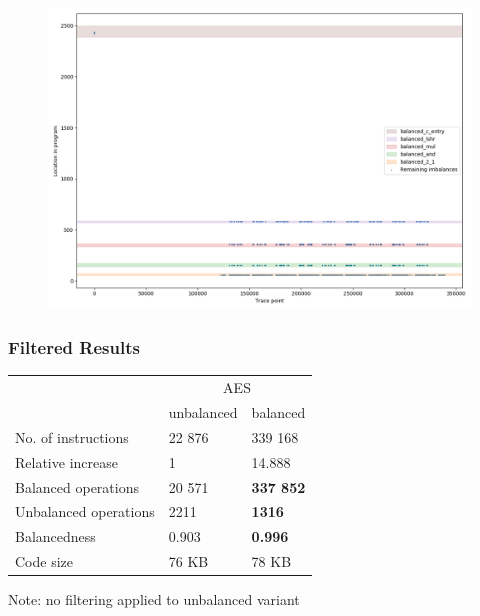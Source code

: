 \documentclass[11pt,t,usepdftitle=false,aspectratio=169]{beamer}
\begin{document}
\begin{frame}
  \begin{figure}
    \centering
    \includegraphics[height=\textheight]{imbalances-3.png}
  \end{figure}
\end{frame}


\begin{frame}
  \frametitle{Filtered Results}
  \vfill
  \begin{center}
  \begin{tabular}{|l|l|l|}
    \hline
    & \multicolumn{2}{c|}{AES} \\
    \cline{2-3}
    & unbalanced & balanced \\
    \cline{2-3}
    No. of instructions & 22 876 & 339 168 \\
    Relative increase & 1 & 14.888 \\
    Balanced operations & 20 571 & \textcolor{uibkorange}{\textbf{337 852}} \\
    Unbalanced operations & 2211 & \textcolor{uibkorange}{\textbf{1316}} \\
    Balancedness      & 0.903 & \textcolor{uibkorange}{\textbf{0.996}} \\
    Code size         & 76 KB & 78 KB \\
    \hline
  \end{tabular}
  \end{center}
  \vspace{1ex}
  Note: no filtering applied to unbalanced variant
  \vfill
\end{frame}
\end{document}
